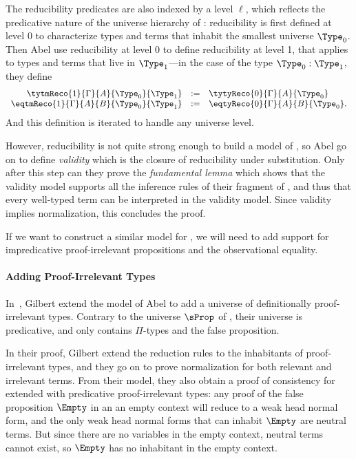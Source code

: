 The reducibility predicates are also indexed by a level \( \ell \), which reflects 
the predicative nature of the universe hierarchy of \MLTT: reducibility is 
first defined at level $0$ to characterize types and terms that inhabit the 
smallest universe \( \Type_0 \).
% 
Then Abel \etal use reducibility at level 0 to define reducibility at level 1, 
that applies to types and terms that live in \( \Type_1 \)---in the case of
the type \( \Type_0 : \Type_1 \), they define
\[
\begin{array}{rcl}
  \tytmReco{1}{\Gamma}{A}{\Type_0}{\Type_1} & := & \tytyReco{0}{\Gamma}{A}{\Type_0} \\
  \eqtmReco{1}{\Gamma}{A}{B}{\Type_0}{\Type_1} & := & \eqtyReco{0}{\Gamma}{A}{B}{\Type_0}. 
\end{array}
\]
% 
And this definition is iterated to handle any universe level.

However, reducibility is not quite strong enough to build a model of \MLTT, 
so Abel \etal go on to define \emph{validity} which is the closure 
of reducibility under substitution.
% 
Only after this step can they prove the \emph{fundamental lemma} which shows 
that the validity model supports all the inference rules of their fragment of
\MLTT, and thus that every well-typed term can be interpreted in the validity
model. Since validity implies normalization, this concludes the proof.

If we want to construct a similar model for \SetoidCC, we will need to add
support for impredicative proof-irrelevant propositions and the observational 
equality.

\paragraph*{Adding Proof-Irrelevant Types}
% 
In~, Gilbert \etal extend the model of 
Abel \etal to add a universe of definitionally proof-irrelevant types.
Contrary to the universe \( \sProp \) of \SetoidCC, their universe is
predicative, and only contains \( \Pi \)-types and the false proposition.

In their proof, Gilbert \etal extend the reduction rules to the inhabitants of 
proof-irrelevant types, and they go on to prove normalization for both relevant
and irrelevant terms.
%
From their model, they also obtain a proof of consistency for \MLTT 
extended with predicative proof-irrelevant types: any proof of the false 
proposition \( \Empty \) in an an empty context will reduce to a weak head 
normal form, and the only weak head normal forms that can inhabit 
\( \Empty \) are neutral terms. 
% 
But since there are no variables in the empty context, neutral terms cannot 
exist, so \( \Empty \) has no inhabitant in the empty context.

